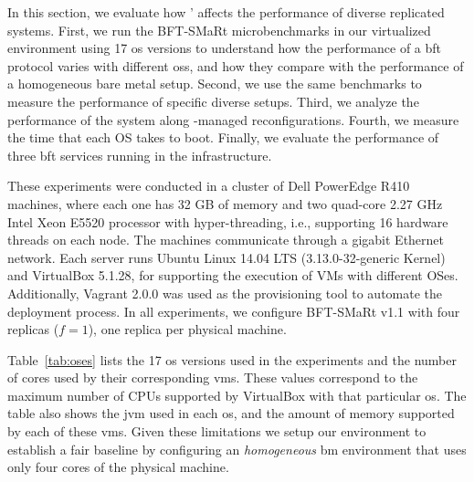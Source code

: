 In this section, we evaluate how \system' affects the performance of diverse replicated systems.
First, we run the BFT-SMaRt microbenchmarks in our virtualized environment using 17 \gls{os} versions to understand how the performance of a \gls{bft} protocol varies with different \glspl{os}, and how they compare with the performance of a homogeneous bare metal setup.
Second, we use the same benchmarks to measure the performance of specific diverse setups.
Third, we analyze the performance of the system along \system-managed reconfigurations.
Fourth, we measure the time that each OS takes to boot.
Finally, we evaluate the performance of three \gls{bft} services running in the \system infrastructure.


These experiments were conducted in a cluster of Dell PowerEdge R410 machines, where each one has 32 GB of memory and two quad-core 2.27 GHz Intel Xeon E5520 processor with hyper-threading, i.e., supporting 16 hardware threads on each node.
The machines communicate through a gigabit Ethernet network.
Each server runs Ubuntu Linux 14.04 LTS (3.13.0-32-generic Kernel) and VirtualBox 5.1.28, for supporting the execution of VMs with different OSes. 
Additionally, Vagrant 2.0.0 was used as the provisioning tool to automate the deployment process.
In all experiments, we configure BFT-SMaRt v1.1 with four replicas ($f=1$), one replica per physical machine.

Table~\ref{tab:oses} lists the 17 \gls{os} versions used in the experiments and the number of cores used by their corresponding \glspl{vm}.
These values correspond to the maximum number of CPUs supported by VirtualBox with that particular \gls{os}.
The table also shows the \gls{jvm} used in each \gls{os}, and the amount of memory supported by each of these \glspl{vm}.
Given these limitations we setup our environment to establish a fair baseline by configuring an \emph{homogeneous} \gls{bm} environment that uses only four cores of the physical machine. 



